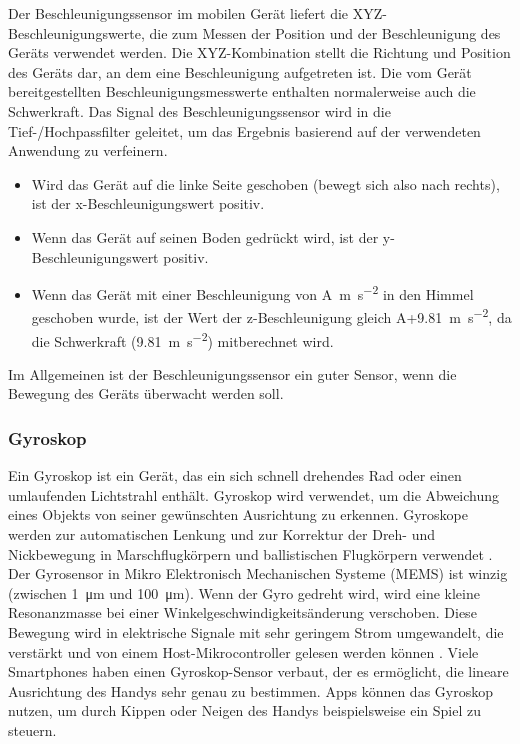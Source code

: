 Der Beschleunigungssensor im mobilen Gerät liefert die XYZ-Beschleunigungswerte, die zum Messen der Position und der Beschleunigung des Geräts verwendet werden. Die XYZ-Kombination stellt die Richtung und Position des Geräts dar, an dem eine Beschleunigung aufgetreten ist. Die vom Gerät bereitgestellten Beschleunigungsmesswerte enthalten normalerweise auch die Schwerkraft. Das Signal des Beschleunigungssensor wird in die Tief-/Hochpassfilter geleitet, um das Ergebnis basierend auf der verwendeten Anwendung zu verfeinern. \citep{Sathish2021}
\begin{itemize}
	\item Wird das Gerät auf die linke Seite geschoben (bewegt sich also nach rechts), ist der x-Beschleunigungswert positiv.
	\item Wenn das Gerät auf seinen Boden gedrückt wird, ist der y-Beschleunigungswert positiv.
	\item Wenn das Gerät mit einer Beschleunigung von A\SI[per-mode = symbol]{}{\meter\per\square\second} in den Himmel geschoben wurde, ist der Wert der z-Beschleunigung gleich A+\SI[per-mode = symbol]{ 9,81}{\meter\per\square\second}, da die Schwerkraft (\SI[per-mode = symbol]{9,81}{\meter\per\square\second}) mitberechnet wird.
\end{itemize}
Im Allgemeinen ist der Beschleunigungssensor ein guter Sensor, wenn die Bewegung des Geräts überwacht werden soll. \citep{DevelopersMotionSen}

%
%
%
%
\subsubsection{Gyroskop}

Ein Gyroskop ist ein Gerät, das ein sich schnell drehendes Rad oder einen umlaufenden Lichtstrahl enthält. Gyroskop wird verwendet, um die Abweichung eines Objekts von seiner gewünschten Ausrichtung zu erkennen. Gyroskope werden zur automatischen Lenkung und zur Korrektur der Dreh- und Nickbewegung in Marschflugkörpern und ballistischen Flugkörpern verwendet \citep{RogersGyro}.
Der Gyrosensor in Mikro Elektronisch Mechanischen Systeme (MEMS) ist winzig (zwischen \SI{1}{\micro\meter} und \SI{100}{\micro\meter}). Wenn der Gyro gedreht wird, wird eine kleine Resonanzmasse bei einer Winkelgeschwindigkeitsänderung verschoben. Diese Bewegung wird in elektrische Signale mit sehr geringem Strom umgewandelt, die verstärkt und von einem Host-Mikrocontroller gelesen werden können \citep{sparkfunGyro}.
Viele Smartphones haben einen Gyroskop-Sensor verbaut, der es ermöglicht, die lineare Ausrichtung des Handys sehr genau zu bestimmen. Apps können das Gyroskop nutzen, um durch Kippen oder Neigen des Handys beispielsweise ein Spiel zu steuern.

